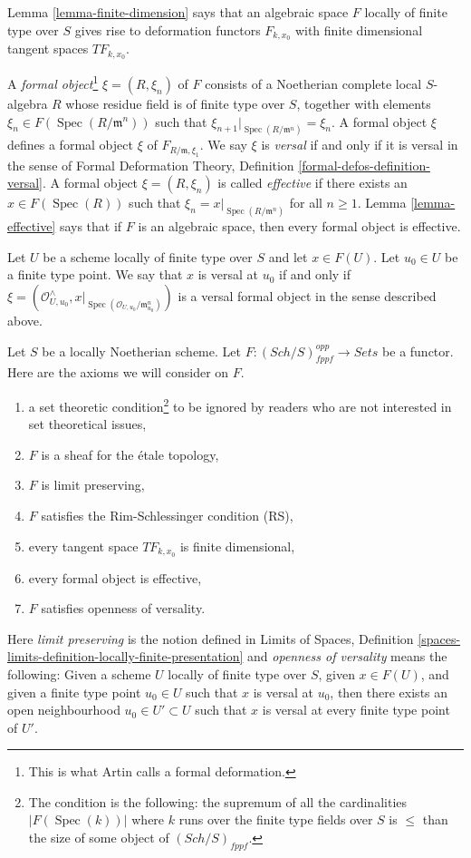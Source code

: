 \documentclass{stacks-project}
\theoremstyle{plain}
\theoremstyle{definition}
\theoremstyle{remark}
\numberwithin{equation}{subsection}
\def\Spec{\mathop{\mathrm{Spec}}}
\def\Sch{\mathit{Sch}}
\begin{document}
\medskip\noindent
Lemma \ref{lemma-finite-dimension} says that an algebraic space $F$
locally of finite type over $S$ gives rise to deformation functors
$F_{k, x_0}$ with finite dimensional tangent spaces $TF_{k, x_0}$.

\medskip\noindent
A {\it formal object}\footnote{This is what Artin calls a formal deformation.}
$\xi = (R, \xi_n)$ of $F$ consists of a Noetherian
complete local $S$-algebra $R$ whose residue field is of finite type
over $S$, together with elements $\xi_n \in F(\Spec(R/\mathfrak m^n))$
such that $\xi_{n + 1}|_{\Spec(R/\mathfrak m^n)} = \xi_n$. A formal
object $\xi$ defines a formal object $\xi$ of $F_{R/\mathfrak m, \xi_1}$.
We say $\xi$ is {\it versal} if and only if it is versal in the sense of
Formal Deformation Theory, Definition \ref{formal-defos-definition-versal}.
A formal object $\xi = (R, \xi_n)$ is called {\it effective}
if there exists an $x \in F(\Spec(R))$ such that
$\xi_n = x|_{\Spec(R/\mathfrak m^n)}$ for all $n \geq 1$.
Lemma \ref{lemma-effective} says that if $F$ is an algebraic space,
then every formal object is effective.

\medskip\noindent
Let $U$ be a scheme locally of finite type over $S$ and let $x \in F(U)$.
Let $u_0 \in U$ be a finite type point. We say that $x$ is versal at $u_0$
if and only if
$\xi = (\mathcal{O}_{U, u_0}^\wedge,
x|_{\Spec(\mathcal{O}_{U, u_0}/\mathfrak m_{u_0}^n)})$
is a versal formal object in the sense described above.

\medskip\noindent
Let $S$ be a locally Noetherian scheme. Let
$F : (\Sch/S)_{fppf}^{opp} \to \textit{Sets}$ be a functor.
Here are the axioms we will consider on $F$.
\begin{enumerate}
\item[{[-1]}]  a set theoretic condition\footnote{The condition is the
following: the supremum of all the cardinalities
$|F(\Spec(k))|$ where $k$ runs over the finite
type fields over $S$ is $\leq$ than the size of some
object of $(\Sch/S)_{fppf}$.} to be ignored by
readers who are not interested in set theoretical issues,
\item[{[0]}] $F$ is a sheaf for the \'etale topology,
\item[{[1]}] $F$ is limit preserving,
\item[{[2]}] $F$ satisfies the Rim-Schlessinger condition (RS),
\item[{[3]}] every tangent space $TF_{k, x_0}$ is finite dimensional,
\item[{[4]}] every formal object is effective,
\item[{[5]}] $F$ satisfies openness of versality.
\end{enumerate}
Here {\it limit preserving} is the notion defined in
Limits of Spaces, Definition
\ref{spaces-limits-definition-locally-finite-presentation} and
{\it openness of versality} means the following: Given a scheme $U$
locally of finite type over $S$, given $x \in F(U)$, and given
a finite type point $u_0 \in U$ such that $x$ is versal at $u_0$,
then there exists an open neighbourhood $u_0 \in U' \subset U$
such that $x$ is versal at every finite type point of $U'$.
\end{document}
